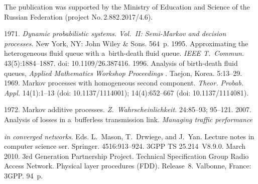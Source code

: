 




\Ack
\noindent
The publication was supported by the Ministry of Education and Science of the Russian Federation 
(project No.\,2.882.2017/4.6). 



\vspace*{6pt}

  \begin{multicols}{2}

\renewcommand{\bibname}{\protect\rmfamily References}

{\small\frenchspacing
 {%
 \begin{thebibliography}{9}
 1971. \textit{Dynamic probabilistic systems. Vol.~II: Semi-Markov and 
decision processes}. New York, NY: John Wiley \& Sons. 564~p.
 1995. Approximating the heterogeneous fluid 
queue with a~birth-death fluid queue. \textit{IEEE T.~Commun.} 43(5):1884--1887. doi: 
10.1109/26.387416.
 1996. Analysis of birth-death fluid 
queues, \textit{Applied Mathematics Workshop Proceedings }. Taejon, Korea. 5:13--29.
 1969. 
Markov processes with homogeneous second component. \textit{Theor. 
Probab. Appl.} 14(1):1--13  (doi: 10.1137/1114001);
14(4):652--667 (doi: 10.1137/1114081).



 1972. Markov additive processes. 
\textit{Z.~Wahrscheinlichkeit.}  24:85--93; 95--121. 
 2007. Analysis of losses in a~bufferless transmission link. 
\textit{Managing traffic performance}\linebreak\vspace*{-11pt}

\columnbreak

\noindent
\textit{in converged networks}. Eds. L.~Mason, T.~Drwiege, and 
J.~Yan. Lecture notes in computer science ser. Springer. 4516:913--924.
3GPP TS 25.214~V8.9.0. March 2010. 3rd Generation Partnership Project. Technical Specification 
Group Radio Access Network. Physical layer procedures (FDD). Release~8. Valbonne, France: 
3GPP. 94~p.
\end{thebibliography}

 }
 }

\end{multicols}

